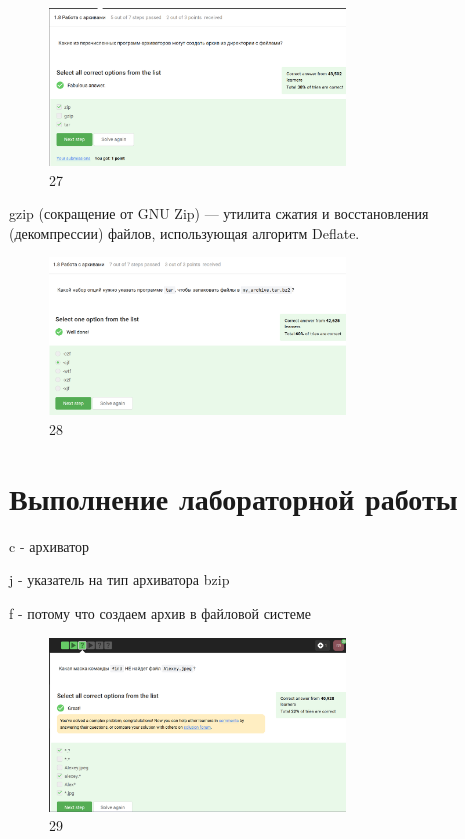 \begin{figure}
\hypertarget{fig:027}{%
\centering
\includegraphics[width=0.7\textwidth,height=\textheight]{image/27.png}
\caption{27}\label{fig:027}
}
\end{figure}

gzip (сокращение от GNU Zip) --- утилита сжатия и восстановления
(декомпрессии) файлов, использующая алгоритм Deflate.

\begin{figure}
\hypertarget{fig:028}{%
\centering
\includegraphics[width=0.7\textwidth,height=\textheight]{image/28.png}
\caption{28}\label{fig:028}
}
\end{figure}

\hypertarget{ux432ux44bux43fux43eux43bux43dux435ux43dux438ux435-ux43bux430ux431ux43eux440ux430ux442ux43eux440ux43dux43eux439-ux440ux430ux431ux43eux442ux44b-19}{%
\section{Выполнение лабораторной
работы}\label{ux432ux44bux43fux43eux43bux43dux435ux43dux438ux435-ux43bux430ux431ux43eux440ux430ux442ux43eux440ux43dux43eux439-ux440ux430ux431ux43eux442ux44b-19}}

c - архиватор

j - указатель на тип архиватора bzip

f - потому что создаем архив в файловой системе

\begin{figure}
\hypertarget{fig:029}{%
\centering
\includegraphics[width=0.7\textwidth,height=\textheight]{image/29.png}
\caption{29}\label{fig:029}
}
\end{figure}

